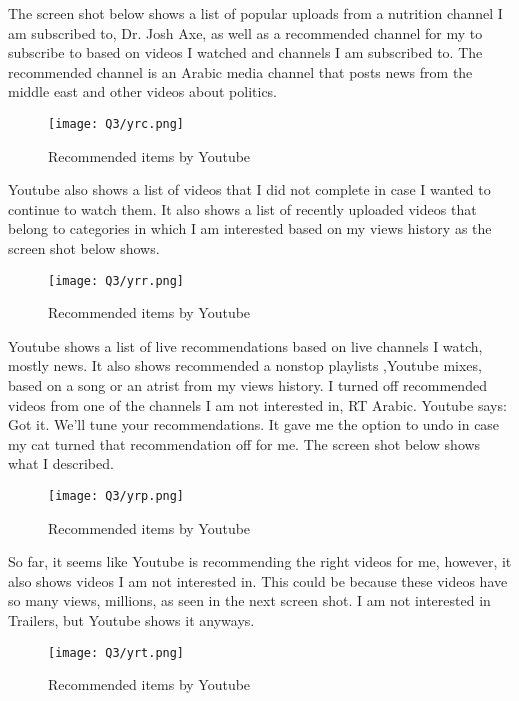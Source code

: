 \pagebreak

The screen shot below shows a list of popular uploads from a nutrition channel I am subscribed to, Dr. Josh Axe, as well as a recommended channel for my to subscribe to based on videos I watched and channels I am subscribed to. The recommended channel is an Arabic media channel that posts news from the middle east and other videos about politics.

\begin{figure}[h]
\caption{Recommended items by Youtube}
\centering
\texttt{[image: Q3/yrc.png]}
\end{figure}

\pagebreak

Youtube also shows a list of videos that I did not complete in case I wanted to continue to watch them. It also shows a list of recently uploaded videos that belong to categories in which I am interested based on my views history as the screen shot below shows.

\begin{figure}[h]
\caption{Recommended items by Youtube}
\centering
\texttt{[image: Q3/yrr.png]}
\end{figure}

\pagebreak

Youtube shows a list of live recommendations based on live channels I watch, mostly news. It also shows recommended a nonstop playlists ,Youtube mixes, based on a song or an atrist from my views history. I turned off recommended videos from one of the channels I am not interested in, RT Arabic. Youtube says: Got it. We'll tune your recommendations. It gave me the option to undo in case my cat turned that recommendation off for me. The screen shot below shows what I described.


\begin{figure}[h]
\caption{Recommended items by Youtube}
\centering
\texttt{[image: Q3/yrp.png]}
\end{figure}

\pagebreak

So far, it seems like Youtube is recommending the right videos for me, however, it also shows videos I am not interested in. This could be because these videos have so many views, millions, as seen in the next screen shot. I am not interested in Trailers, but Youtube shows it anyways.

\begin{figure}[h]
\caption{Recommended items by Youtube}
\centering
\texttt{[image: Q3/yrt.png]}
\end{figure}

